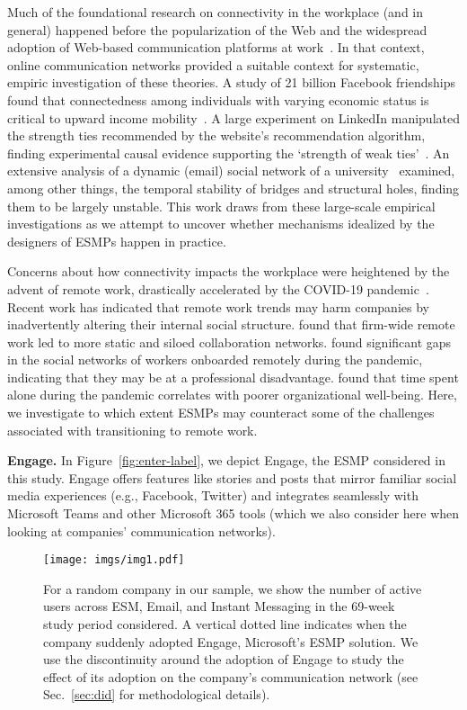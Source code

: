 Much of the foundational research on connectivity in the workplace (and in general) happened before the popularization of the Web and the widespread adoption of Web-based communication platforms at work~\cite{coleman1988social,granovetter1973strength,burt_structural_1992}. In that context, online communication networks provided a suitable context for systematic, empiric investigation of these theories.
A study of 21 billion Facebook friendships found that connectedness among individuals with varying economic status is critical to upward income mobility~\cite{chetty2022social}.
A large experiment on LinkedIn manipulated the strength ties recommended by the website's recommendation algorithm, finding experimental causal evidence
supporting the `strength of weak ties'~\cite{rajkumar2022causal}.
An extensive analysis of a dynamic (email) social network of a university~\cite{kossinets2006empirical} examined, among other things, the temporal stability of bridges and structural holes, finding them to be largely unstable.
This work draws from these large-scale empirical investigations as we attempt to uncover whether mechanisms idealized by the designers of ESMPs happen in practice.

Concerns about how connectivity impacts the workplace were heightened by the advent of remote work, drastically accelerated by the COVID-19 pandemic~\cite{phillips2020working}.
Recent work has indicated that remote work trends may harm companies by inadvertently altering their internal social structure.
\citet{yang2022effects} found that firm-wide remote work led to more static and siloed collaboration networks.
\citet{yu2023large} found significant gaps in the social networks of workers onboarded remotely during the pandemic, indicating that they may be at a professional disadvantage.
\citet{brown2023effects} found that time spent alone during the pandemic correlates with poorer organizational well-being.
Here, we investigate to which extent ESMPs may counteract some of the challenges associated with transitioning to remote work.

\vspace{0.5mm}
\noindent
\textbf{Engage.} In Figure~\ref{fig:enter-label}, we depict Engage, the ESMP considered in this study. Engage offers features like stories and posts that mirror familiar social media experiences (e.g., Facebook, Twitter) and integrates seamlessly with Microsoft Teams and other Microsoft 365 tools (which we also consider here when looking at companies' communication networks).

\begin{figure}[t]
    \centering
    \texttt{[image: imgs/img1.pdf]}
    \caption{For a random company in our sample, we show the number of active users across ESM, Email, and Instant Messaging in the 69-week study period considered. A vertical dotted line indicates when the company suddenly adopted Engage, Microsoft's ESMP solution. We use the discontinuity around the adoption of Engage to study the effect of its adoption on the company's communication network (see Sec.~\ref{sec:did} for methodological details).}
    \label{fig:breakingpoint_example}
\end{figure}